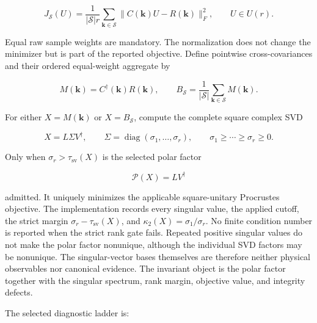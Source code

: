 \documentclass[11pt]{article}
\begin{document}
\begin{equation}
 J_{\mathcal S}(U)
 =\frac{1}{|\mathcal S|r}
 \sum_{\mathbf k\in\mathcal S}
 \lVert C(\mathbf k)U-R(\mathbf k)\rVert_F^2,
 \qquad U\in U(r).
 \label{eq:alignment-global-objective}
\end{equation}

Equal raw sample weights are mandatory. The normalization does not change the minimizer
but is part of the reported objective. Define pointwise cross-covariances and their
ordered equal-weight aggregate by

\begin{equation}
 M(\mathbf k)=C^\dagger(\mathbf k)R(\mathbf k),
 \qquad
 B_{\mathcal S}=\frac{1}{|\mathcal S|}
 \sum_{\mathbf k\in\mathcal S}M(\mathbf k).
 \label{eq:alignment-cross-covariances}
\end{equation}

For either $X=M(\mathbf k)$ or $X=B_{\mathcal S}$, compute the complete square complex
SVD

\begin{equation}
 X=L\Sigma V^\dagger,
 \qquad
 \Sigma=\operatorname{diag}(\sigma_1,\ldots,\sigma_r),
 \qquad
 \sigma_1\geq\cdots\geq\sigma_r\geq0.
 \label{eq:alignment-svd}
\end{equation}

Only when $\sigma_r>\tau_{\mathrm{sv}}(X)$ is the selected polar factor

\begin{equation}
 \mathcal P(X)=LV^\dagger
 \label{eq:alignment-polar-factor}
\end{equation}

admitted. It uniquely minimizes the applicable square-unitary Procrustes objective. The
implementation records every singular value, the applied cutoff, the strict margin
$\sigma_r-\tau_{\mathrm{sv}}(X)$, and
$\kappa_2(X)=\sigma_1/\sigma_r$. No finite condition number is reported when the strict
rank gate fails. Repeated positive singular values do not make the polar factor
nonunique, although the individual SVD factors may be nonunique. The singular-vector
bases themselves are therefore neither physical observables nor canonical evidence. The
invariant object is the polar factor together with the singular spectrum, rank margin,
objective value, and integrity defects.

The selected diagnostic ladder is:
\end{document}
